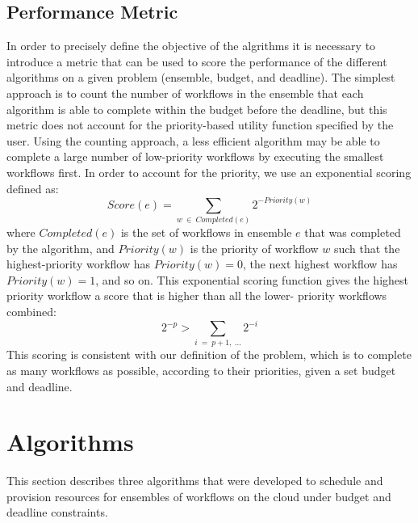 \documentclass[preprint,5p]{elsarticle}
\begin{document}
\subsection{Performance Metric}
\label{sec:perf_metric}
In order to precisely define the objective of the algrithms it is necessary to
introduce a metric that can be used to score the performance of the different
algorithms on a given problem (ensemble, budget, and deadline). The simplest
approach is to count the number of workflows in the ensemble that each algorithm
is able to complete within the budget before the deadline, but this metric does
not account for the priority-based utility function specified by the user. Using
the counting approach, a less efficient algorithm may be able to complete a
large number of low-priority workflows by executing the smallest workflows
first. In order to account for the priority, we use an exponential
scoring defined as:
\begin{equation}
\label{eq:score}
Score(e) = \sum_{w~\in~Completed(e)}{2^{-Priority(w)}}
\end{equation}
where $Completed(e)$ is the set of workflows in ensemble $e$ that was completed
by the algorithm, and $Priority(w)$ is the priority of workflow $w$ such that
the highest-priority workflow has $Priority(w)=0$, the next highest workflow has
$Priority(w)=1$, and so on. This exponential scoring function gives the highest
priority workflow a score that is higher than all the lower- priority workflows
combined:
$$ 2^{-p} > \sum_{i~=~p+1,~\ldots}2^{-i} $$
This scoring is consistent with our definition of the problem, which is to
complete as many workflows as possible, according to their priorities, given a
set budget and deadline.


\section{Algorithms}
\label{sec:algorithms}

This section describes three algorithms that were developed to schedule and
provision resources for ensembles of workflows on the cloud under budget and
deadline constraints.
\end{document}
